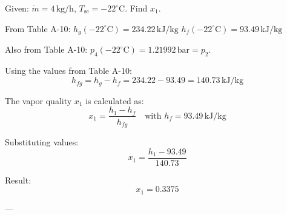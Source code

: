 Given: \( \dot{m} = 4 \, \text{kg/h} \), \( T_{\text{se}} = -22^\circ\text{C} \).  
Find \( x_1 \).  

From Table A-10:  
\( h_g(-22^\circ\text{C}) = 234.22 \, \text{kJ/kg} \)  
\( h_f(-22^\circ\text{C}) = 93.49 \, \text{kJ/kg} \)  

Also from Table A-10:  
\( p_4(-22^\circ\text{C}) = 1.21992 \, \text{bar} = p_2 \).  

Using the values from Table A-10:  
\[
h_{fg} = h_g - h_f = 234.22 - 93.49 = 140.73 \, \text{kJ/kg}
\]  

The vapor quality \( x_1 \) is calculated as:  
\[
x_1 = \frac{h_1 - h_f}{h_{fg}} \quad \text{with } h_f = 93.49 \, \text{kJ/kg}
\]  

Substituting values:  
\[
x_1 = \frac{h_1 - 93.49}{140.73}
\]  

Result:  
\[
x_1 = 0.3375
\]  

---